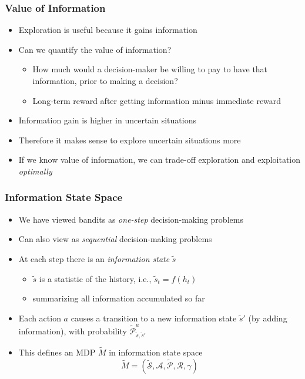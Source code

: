 \documentclass[handout]{beamer}
\begin{document}
\begin{frame}
\frametitle{Value of Information}
\pause
\begin{itemize}[<+->]
\item Exploration is useful because it gains information
\item Can we quantify the value of information?
\begin{itemize}
\item How much would a decision-maker be willing to pay to have that information, prior to making a decision?
\item Long-term reward after getting information minus immediate reward 
\end{itemize}
\item Information gain is higher in uncertain situations
\item Therefore it makes sense to explore uncertain situations more
\item If we know value of information, we can trade-off exploration and exploitation {\em optimally}
\end{itemize}
\end{frame}

\begin{frame}
\frametitle{Information State Space}
\pause
\begin{itemize}[<+->]
\item We have viewed bandits as {\em one-step} decision-making problems
\item Can also view as {\em sequential} decision-making problems
\item At each step there is an {\em information state} $\tilde{s}$
\begin{itemize}
\item $\tilde{s}$ is a statistic of the history, i.e., $\tilde{s}_t = f(h_t)$
\item summarizing all information accumulated so far
\end{itemize}
\item Each action $a$ causes a transition to a new information state $\tilde{s}'$ (by adding information), with probability $\tilde{\mathcal{P}}_{\tilde{s},\tilde{s}'}^a$
\item This defines an MDP $\tilde{M}$ in information state space
$$\tilde{M} = (\tilde{\mathcal{S}}, \mathcal{A}, \tilde{\mathcal{P}}, \mathcal{R}, \gamma)$$
\end{itemize}
\end{frame}
\end{document}
